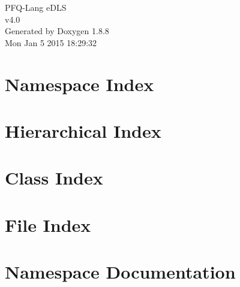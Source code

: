 \documentclass[twoside]{book}
\newcommand{\+}{\discretionary{\mbox{\scriptsize$\hookleftarrow$}}{}{}}
\newcommand{\clearemptydoublepage}{%
  \newpage{\pagestyle{empty}\cleardoublepage}%
}
\begin{document}
\hypersetup{pageanchor=false,
             bookmarks=true,
             bookmarksnumbered=true,
             pdfencoding=unicode
            }
\begin{titlepage}
\vspace*{7cm}
\begin{center}%
{\Large P\+F\+Q-\/\+Lang e\+D\+L\+S \\[1ex]\large v4.\+0 }\\
\vspace*{1cm}
{\large Generated by Doxygen 1.8.8}\\
\vspace*{0.5cm}
{\small Mon Jan 5 2015 18:29:32}\\
\end{center}
\end{titlepage}
\clearemptydoublepage
\tableofcontents
\clearemptydoublepage
{}
\hypersetup{pageanchor=true}

\chapter{Namespace Index}

\chapter{Hierarchical Index}

\chapter{Class Index}

\chapter{File Index}

\chapter{Namespace Documentation}





\end{document}
